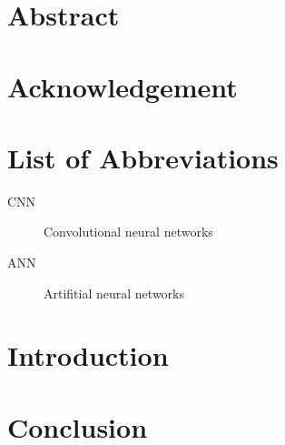 \documentclass[a4paper, 12pt, oneside]{book}
\begin{document}
\frontmatter
\chapter*{Abstract}
\blindtext
{}
\nopagebreak

\chapter*{Acknowledgement}
\blindtext
{}

\tableofcontents
{}
\listoftables
{}
\listoffigures
{}

\chapter{List of Abbreviations}

\begin{description}

  \item[CNN] Convolutional neural networks
  \item[ANN] Artifitial neural networks

\end{description}

\mainmatter

\chapter*{Introduction}
\blindtext[5]





\chapter*{Conclusion}
\blindtext[5]


\backmatter

\nocite{*}



\appendix
\clearpage
{}
\end{document}
